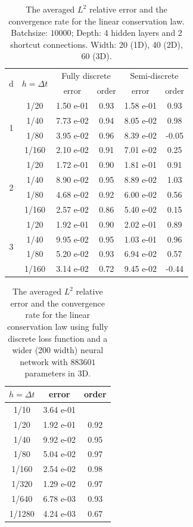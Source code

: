 \documentclass[aspectratio=169]{beamer}
\begin{document}
\begin{frame}
\begin{table}[H]
	\centering
	\begin{tabular}{|c|c|c|c|c|c|}
		\hline
		\multirow{2}{*}{d}	& \multirow{2}{*}{$h = \Delta t $}&  \multicolumn{2}{c|}{Fully discrete} & \multicolumn{2}{c|}{Semi-discrete} \\
		\cline{3-6}
		& & error & order & error & order\\
		\hline
		\multirow{4}{*}{1} 
		& 1/20 & 1.50 e-01 & 0.93 & 1.58 e-01 & 0.93\\
		& 1/40 & 7.73 e-02 & 0.94 & 8.05 e-02 & 0.98\\
		& 1/80 & 3.95 e-02 & 0.96 & 8.39 e-02 & -0.05\\
		& 1/160& 2.10 e-02 & 0.91 & 7.01 e-02 & 0.25\\
		\hline
		\multirow{4}{*}{2} 
		& 1/20 & 1.72 e-01 & 0.90  & 1.81 e-01 & 0.91\\
		& 1/40 & 8.90 e-02 & 0.95  & 8.89 e-02 & 1.03\\
		& 1/80 & 4.68 e-02 & 0.92  & 6.00 e-02 & 0.56\\
		& 1/160& 2.57 e-02 & 0.86  & 5.40 e-02 & 0.15\\
		\hline
		\multirow{4}{*}{3} 
		& 1/20 & 1.92 e-01 & 0.90  & 2.02 e-01 & 0.89\\
		& 1/40 & 9.95 e-02 & 0.95  & 1.03 e-01 & 0.96\\
		& 1/80 & 5.20 e-02 & 0.93  & 6.94 e-02 & 0.57\\
		& 1/160& 3.14 e-02 & 0.72  & 9.45 e-02 & -0.44\\
		\hline
	\end{tabular}
	\caption{The averaged $L^2$ relative error and the convergence rate for the linear conservation law. Batchsize: $10000$; Depth: 4 hidden layers and 2 shortcut connections. Width:  20 (1D), 40 (2D), 60 (3D).}
\end{table}  
\end{frame}

\begin{frame}
\begin{table}[H]
	\centering 
	\begin{tabular}{|c|c|c|}
		\hline
		$h = \Delta t $ & error & order \\
		\hline
		1/10 & 3.64 e-01 & \\
		1/20 & 1.92 e-01 & 0.92\\
		1/40 & 9.92 e-02 & 0.95\\
		1/80 & 5.04 e-02 & 0.97\\
		1/160 & 2.54 e-02 & 0.98\\
		1/320 & 1.29 e-02 & 0.97\\
		1/640 & 6.78 e-03 & 0.93\\
		1/1280 &4.24 e-03 & 0.67\\
		\hline
	\end{tabular}
	\caption{The averaged $L^2$ relative error and the convergence rate for the linear conservation law using fully discrete loss function and a wider (200 width) neural network with $883601$ parameters in 3D.}
\end{table}
\end{frame}
\end{document}

